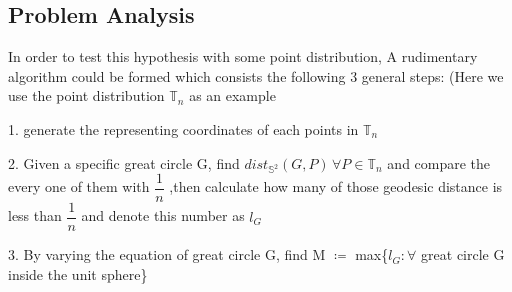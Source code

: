 \documentclass[12pt]{article}
\numberwithin{equation}{section}
\let\bb\mathbb
\let\bb\mathbb
\begin{document}
	\subsection{Problem Analysis}
	In order to test this hypothesis with some point distribution, A rudimentary algorithm could be formed which consists the following 3 general steps: (Here we use the point distribution $\bb{T}_n$ as an example\par
	1. generate the representing coordinates of each points in $\bb{T}_n$
	\par
	2. Given a specific great circle G, find $dist_{{\bb{S}}^2} (G, P) \, \forall P \in \bb{T}_n$
	and compare the every one of them with $\dfrac{1}{n} $
	,then calculate how many of those geodesic distance is less than $\dfrac{1	}{n}$ and denote this number as $l_G$ \par 
	3. By varying the equation of great circle G, find M $\coloneqq$ max\{$l_G: \forall$ great circle G inside the unit sphere\} \newline  
	
\end{document}

